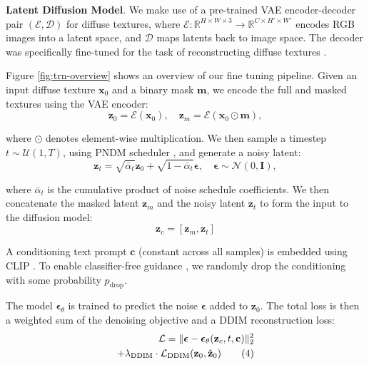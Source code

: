 \documentclass[11pt,twocolumn]{article}
\begin{document}
\textbf{Latent Diffusion Model}. We make use of a pre-trained VAE \cite{vae} encoder-decoder pair $(\mathcal{E}, \mathcal{D})$ 
for diffuse textures, where $\mathcal{E}: \mathbb{R}^{H \times W \times 3} \rightarrow \mathbb{R}^{C \times H' \times W'}$ 
encodes RGB images into a latent space, and $\mathcal{D}$ maps latents back to image space. 
The decoder was specifically fine-tuned for the task of reconstructing diffuse textures 
\cite{dresscode}.

Figure \ref{fig:trn-overview} shows an overview of our fine tuning pipeline. Given an input diffuse texture $\mathbf{x}_0$ and a binary mask $\mathbf{m}$, we encode the full and masked textures using the VAE encoder:
\begin{equation}
\mathbf{z}_0 = \mathcal{E}(\mathbf{x}_0), \quad \mathbf{z}_m = \mathcal{E}(\mathbf{x}_0 \odot \mathbf{m}),
\end{equation}

where $\odot$ denotes element-wise multiplication. We then sample a timestep $t \sim \mathcal{U}(1, T)$, using PNDM scheduler \cite{pndm}, and generate a noisy latent:
\vspace{0.0em}
\begin{equation}
\mathbf{z}_t = \sqrt{\bar{\alpha}_t} \mathbf{z}_0 + \sqrt{1 - \bar{\alpha}_t} \boldsymbol{\epsilon}, \quad \boldsymbol{\epsilon} \sim \mathcal{N}(0, \mathbf{I}),
\end{equation}

where $\bar{\alpha}_t$ is the cumulative product of noise schedule coefficients. We then concatenate the masked latent $\mathbf{z}_m$ and the noisy latent $\mathbf{z}_t$ to form the input to the diffusion model:
\begin{equation}
\mathbf{z}_c = [\mathbf{z}_m, \mathbf{z}_t]
\end{equation}

A conditioning text prompt $\mathbf{c}$ (constant across all samples) is embedded using CLIP 
\cite{clip}. To enable classifier-free guidance \cite{cfg}, we randomly drop the 
conditioning with some probability $p_{\text{drop}}$.

The model $\boldsymbol{\epsilon}_\theta$ is trained to predict the noise $\boldsymbol{\epsilon}$ added to $\mathbf{z}_0$. The total loss is then a weighted sum of the denoising objective and a DDIM reconstruction loss:
\begin{align}
  \mathcal{L} = \|\boldsymbol{\epsilon} - \boldsymbol{\epsilon}_\theta(\mathbf{z}_c, t, \mathbf{c})\|_2^2 
  \notag \\
  + \lambda_{\text{DDIM}} \cdot \mathcal{L}_{\text{DDIM}}(\mathbf{z}_0, \hat{\mathbf{z}}_0) \tag{4}
\end{align}
  
\end{document}
